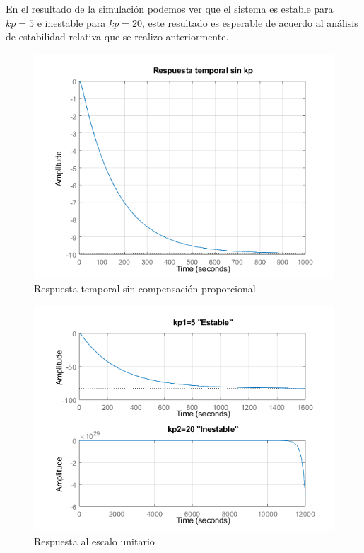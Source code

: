 \documentclass[12pt]{article}
\begin{document}
	En el resultado de la simulación podemos ver que el sistema es estable para $kp=5$ e inestable para $kp=20$, este resultado es esperable de acuerdo al análisis de estabilidad relativa que se realizo anteriormente.
	
	\begin{figure}[bh]
		\centering
		\includegraphics[width=1\linewidth]{Imagenes/Respuesta_temporal_sin_kp}
		\caption[Respuesta temporal sin compensación proporcional]{Respuesta temporal sin compensación proporcional}
		\label{fig:respuestatemporalsinkp}
	\end{figure}
	
	\begin{figure}
		\centering
		\includegraphics[width=1\linewidth]{Imagenes/Respuesta_escalon_Fdtglobal}
		\caption[Respuesta al escalo unitario]{Respuesta al escalo unitario}
		\label{fig:respuestaescalonfdtglobal}
	\end{figure}\newpage
	
\end{document}
